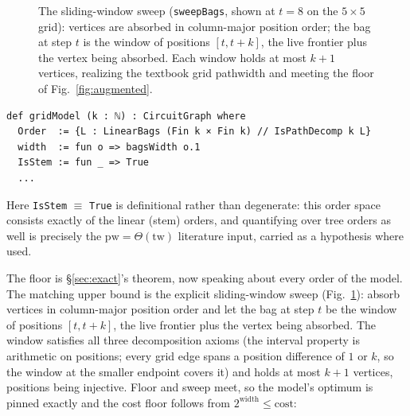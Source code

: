 \documentclass[sigplan,10pt,screen,review,anonymous]{acmart}
\newcommand{\pw}{\mathrm{pw}}
\newcommand{\tw}{\mathrm{tw}}
\begin{document}
\begin{figure}[t]
\centering
{}
\caption{The sliding-window sweep (\texttt{sweepBags}, shown at $t=8$ on the $5\times5$
grid): vertices are absorbed in column-major position order; the bag at step $t$ is the
window of positions $[t, t+k]$, the live frontier plus the vertex being absorbed. Each
window holds at most $k+1$ vertices, realizing the textbook grid pathwidth and meeting the
floor of Fig.~\ref{fig:augmented}.}
\label{fig:window}
\end{figure}

\begin{lstlisting}
def gridModel (k : ℕ) : CircuitGraph where
  Order  := {L : LinearBags (Fin k × Fin k) // IsPathDecomp k L}
  width  := fun o => bagsWidth o.1
  IsStem := fun _ => True
  ...
\end{lstlisting}

\noindent Here \lstinline|IsStem| $\equiv$ \lstinline|True| is definitional rather than
degenerate: this order space consists exactly of the linear (stem) orders, and quantifying
over tree orders as well is precisely the $\pw=\Theta(\tw)$ literature input, carried as a
hypothesis where used.

The floor is \S\ref{sec:exact}'s theorem, now speaking about every order of the model. The
matching upper bound is the explicit sliding-window sweep (Fig.~\ref{fig:window}): absorb
vertices in column-major position order and let the bag at step $t$ be the window of
positions $[t, t+k]$, the live frontier plus the vertex being absorbed. The window
satisfies all three decomposition axioms (the interval property is arithmetic on positions;
every grid edge spans a position difference of $1$ or $k$, so the window at the smaller
endpoint covers it) and holds at most $k+1$ vertices, positions being injective. Floor and
sweep meet, so the model's optimum is pinned exactly and the cost floor follows from
$2^{\mathrm{width}} \le \mathrm{cost}$:
\end{document}
